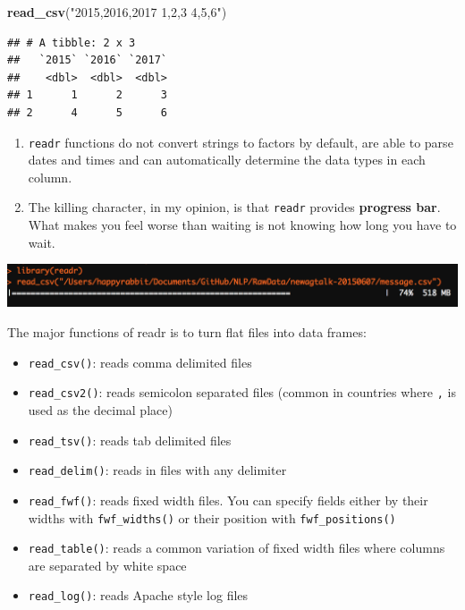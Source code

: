 \documentclass[12pt,]{krantz}
\makeatletter
\newenvironment{Shaded}{\begin{snugshade}}{\end{snugshade}}
\newcommand{\KeywordTok}[1]{\textcolor[rgb]{0.27,0.27,0.27}{\textbf{#1}}}
\newcommand{\NormalTok}[1]{#1}
\newcommand{\StringTok}[1]{\textcolor[rgb]{0.5,0.5,0.5}{#1}}
\providecommand{\tightlist}{%
  \setlength{\itemsep}{0pt}\setlength{\parskip}{0pt}}
\newenvironment{kframe}{%
\medskip{}
\setlength{\fboxsep}{.8em}
 \def\at@end@of@kframe{}%
 \ifinner\ifhmode%
  \def\at@end@of@kframe{\end{minipage}}%
  \begin{minipage}{\columnwidth}%
 \fi\fi%
 \def\FrameCommand##1{\hskip\@totalleftmargin \hskip-\fboxsep
 \colorbox{shadecolor}{##1}\hskip-\fboxsep
     \hskip-\linewidth \hskip-\@totalleftmargin \hskip\columnwidth}%
 \MakeFramed {\advance\hsize-\width
   \@totalleftmargin\z@ \linewidth\hsize
   \@setminipage}}%
 {\par\unskip\endMakeFramed%
 \at@end@of@kframe}
\renewenvironment{Shaded}{\begin{kframe}}{\end{kframe}}
\makeatother
\begin{document}
\begin{Shaded}
\begin{Highlighting}[]
\KeywordTok{read_csv}\NormalTok{(}\StringTok{"2015,2016,2017}
\StringTok{1,2,3}
\StringTok{4,5,6"}\NormalTok{)}
\end{Highlighting}
\end{Shaded}

\begin{verbatim}
## # A tibble: 2 x 3
##   `2015` `2016` `2017`
##    <dbl>  <dbl>  <dbl>
## 1      1      2      3
## 2      4      5      6
\end{verbatim}

\begin{enumerate}
\def\labelenumi{\arabic{enumi}.}
\item
  \texttt{readr} functions do not convert strings to factors by default, are able to parse dates and times and can automatically determine the data types in each column.
\item
  The killing character, in my opinion, is that \texttt{readr} provides \textbf{progress bar}. What makes you feel worse than waiting is not knowing how long you have to wait.
\end{enumerate}

\includegraphics{images/prograssbar.png}

The major functions of readr is to turn flat files into data frames:

\begin{itemize}
\tightlist
\item
  \texttt{read\_csv()}: reads comma delimited files
\item
  \texttt{read\_csv2()}: reads semicolon separated files (common in countries where \texttt{,} is used as the decimal place)
\item
  \texttt{read\_tsv()}: reads tab delimited files
\item
  \texttt{read\_delim()}: reads in files with any delimiter
\item
  \texttt{read\_fwf()}: reads fixed width files. You can specify fields either by their widths with \texttt{fwf\_widths()} or their position with \texttt{fwf\_positions()}\\
\item
  \texttt{read\_table()}: reads a common variation of fixed width files where columns are separated by white space
\item
  \texttt{read\_log()}: reads Apache style log files
\end{itemize}
\end{document}
